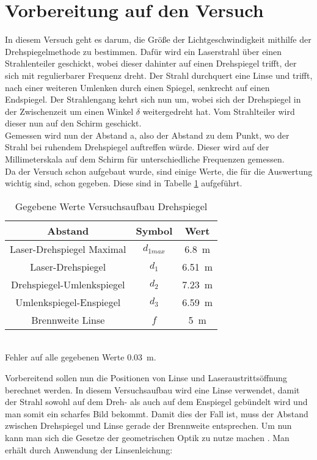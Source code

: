 \section{Vorbereitung auf den Versuch}

In diesem Versuch geht es darum, die Größe der Lichtgeschwindigkeit mithilfe der Drehspiegelmethode zu bestimmen. Dafür wird ein Laserstrahl über einen Strahlenteiler geschickt, wobei dieser dahinter auf einen Drehspiegel trifft, der sich mit regulierbarer Frequenz dreht. Der Strahl durchquert eine Linse und trifft, nach einer weiteren Umlenken durch einen Spiegel, senkrecht auf einen Endspiegel. Der Strahlengang kehrt sich nun um, wobei sich der Drehspiegel in der Zwischenzeit um einen Winkel $\delta$ weitergedreht hat. Vom Strahlteiler wird dieser nun auf den Schirm geschickt.\\
Gemessen wird nun der Abstand a, also der Abstand zu dem Punkt, wo der Strahl bei ruhendem Drehspiegel auftreffen würde. Dieser wird auf der Millimeterskala auf dem Schirm für unterschiedliche Frequenzen gemessen.\\
Da der Versuch schon aufgebaut wurde, sind einige Werte, die für die Auswertung wichtig sind, schon gegeben. Diese sind in Tabelle \ref{tab:Drehspiegel vorgegebene Werte} aufgeführt.

\begin{table}[h]
    \centering
    \caption{Gegebene Werte Versuchsaufbau Drehspiegel}
    \begin{tabular}{c c c}
    \hline
    Abstand & Symbol & Wert \\
    \hline
    Laser-Drehspiegel Maximal & $d_{1max}$ & \SI{6.8}{\metre} \\
    Laser-Drehspiegel & $d_1$ & \SI{6.51}{\metre}\\
    Drehspiegel-Umlenkspiegel & $d_2$ & \SI{7.23}{\metre}\\
    Umlenkspiegel-Enspiegel & $d_3$ & \SI{6.59}{\metre}\\
    Brennweite Linse & $f$ & \SI{5}{\metre}\\
    
    \hline
    \end{tabular}
    \label{tab:Drehspiegel vorgegebene Werte}\\
    Fehler auf alle gegebenen Werte \SI{0.03}{\metre}.
\end{table}

Vorbereitend sollen nun die Positionen von Linse und Laseraustrittsöffnung berechnet werden. In diesem Versuchsaufbau wird eine Linse verwendet, damit der Strahl sowohl auf dem Dreh- als auch auf dem Enspiegel gebündelt wird und man somit ein scharfes Bild bekommt. Damit dies der Fall ist, muss der Abstand zwischen Drehspiegel und Linse gerade der Brennweite entsprechen. Um nun kann man sich die Gesetze der geometrischen Optik zu nutze machen \cite{2}. Man erhält durch Anwendung der Linsenleichung: 

